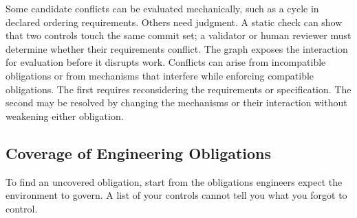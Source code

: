 

Some candidate conflicts can be evaluated mechanically, such as a cycle in declared ordering requirements. Others need judgment. A static check can show that two controls touch the same commit set; a validator or human reviewer must determine whether their requirements conflict. The graph exposes the interaction for evaluation before it disrupts work. Conflicts can arise from incompatible obligations or from mechanisms that interfere while enforcing compatible obligations. The first requires reconsidering the requirements or specification. The second may be resolved by changing the mechanisms or their interaction without weakening either obligation.


\subsection{Coverage of Engineering Obligations}\label{heading:coverage-of-engineering-obligations}


To find an uncovered obligation, start from the obligations engineers expect the environment to govern. A list of your controls cannot tell you what you forgot to control.


